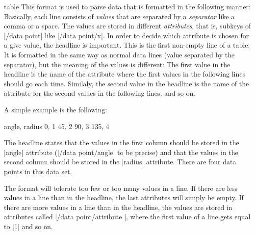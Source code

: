 \begin{dataformat}{table}
  This format is used to parse data that is formatted in the following
  manner: Basically, each line consists of \emph{values} that are
  separated by a \emph{separator} like a comma or a space. The values
  are stored in different \emph{attributes}, that is, subkeys of
  |/data point| like |/data point/x|. In order to decide which
  attribute is chosen for a give value, the headline is
  important. This is the first non-empty line of a table. It is
  formatted in the same way as normal data lines (value separated by
  the separator), but the meaning of the values is different: The
  first value in the headline is the name of the attribute where the
  first values in the following lines should go each time. Similaly,
  the second value in the headline is the name of the attribute for
  the second values in the following lines, and so on.

  A simple example is the following:
\begin{codeexample}
angle, radius
0, 1
45, 2
90, 3
135, 4
\end{codeexample}
  The headline states that the values in the first column should be
  stored in the |angle| attribute (|/data point/angle| to be precise)
  and that the values in the second column should be stored in the
  |radius| attribute. There are four data points in this data set.

  The format will tolerate too few or too many values in a line. If
  there are less values in a line than in the headline, the last
  attributes will simply be empty. If there are more values in a line
  than in the headline, the values are stored in attributes called
  |/data point/attribute |, where the first value
  of a line gets  equal to |1| and so on.


\end{dataformat}
